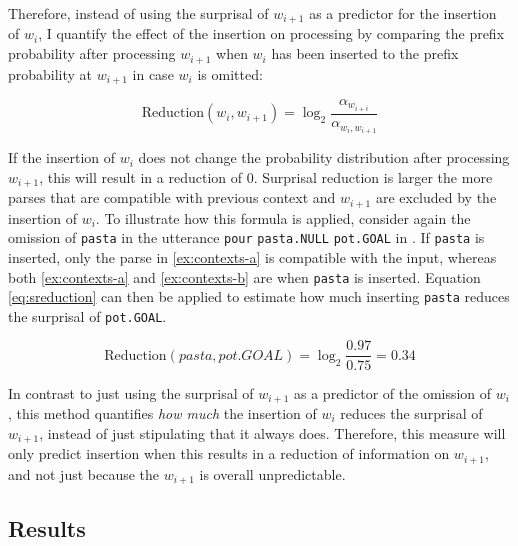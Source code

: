 Therefore, instead of using the surprisal of $w_{i+1}$ as a predictor for the insertion of $w_i$, I quantify the effect of the insertion on processing by comparing the prefix probability after processing $w_{i+1}$ when $w_i$ has been inserted to the prefix probability at $w_{i+1}$ in case $w_i$ is omitted:

\begin{equation} 
 \displaystyle \text{Reduction}(w_i, w_{i+1}) = \log_2 \frac{\alpha_{w_{i+i}}}{\alpha_{w_i, w_{i+1}}} \label{eq:sreduction}
\end{equation}

If the insertion of $w_i$ does not change the probability distribution after processing $w_{i+1}$, this will result in a reduction of 0. Surprisal reduction is larger the more parses that are compatible with previous context and $w_{i+1}$ are excluded by the insertion of $w_i$. To illustrate how this formula is applied, consider again the omission of \texttt{pasta} in the utterance \texttt{pour} \texttt{pasta.NULL} \texttt{pot.GOAL} in \LLast. If \texttt{pasta} is inserted, only the parse in \ref{ex:contexts-a} is compatible with the input, whereas both \ref{ex:contexts-a} and \ref{ex:contexts-b} are when \texttt{pasta} is inserted. Equation \ref{eq:sreduction} can then be applied to estimate how much inserting \texttt{pasta} reduces the surprisal of \texttt{pot.GOAL}.

\begin{equation} 
 \displaystyle \text{Reduction}(\textit{pasta}, \textit{pot.GOAL}) = \log_2 \frac{0.97}{0.75} = 0.34
\end{equation}

In contrast to just using the surprisal of $w_{i+1}$ as a predictor of the omission of $w_i$, this method quantifies \textit{how much} the insertion of $w_i$ reduces the surprisal of $w_{i+1}$,  instead of just stipulating that it always does. Therefore, this measure will only predict insertion when this results in a reduction of information on $w_{i+1}$, and not just because the $w_{i+1}$ is overall unpredictable. 

\subsection{Results}
\label{sec:scripts-production-results}

